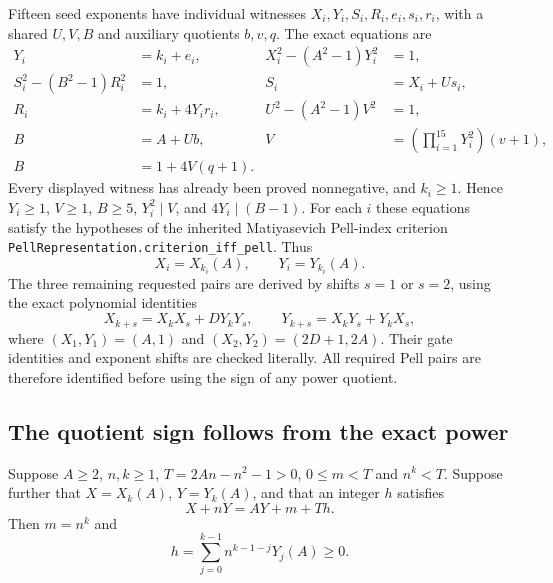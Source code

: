 Fifteen seed exponents have individual witnesses
$X_i,Y_i,S_i,R_i,e_i,s_i,r_i$, with a shared $U,V,B$ and auxiliary
quotients $b,v,q$.  The exact equations are
\begin{align}
 Y_i&=k_i+e_i,& X_i^2-(A^2-1)Y_i^2&=1,\nonumber\\
 S_i^2-(B^2-1)R_i^2&=1,& S_i&=X_i+Us_i,\nonumber\\
 R_i&=k_i+4Y_i r_i,& U^2-(A^2-1)V^2&=1,\label{dc:index}\\
 B&=A+Ub,&
 V&=\left(\prod_{i=1}^{15}Y_i^2\right)(v+1),\nonumber\\
 B&=1+4V(q+1).&&\nonumber
\end{align}
Every displayed witness has already been proved nonnegative, and
$k_i\ge1$.  Hence $Y_i\ge1$, $V\ge1$, $B\ge5$,
$Y_i^2\mid V$, and $4Y_i\mid(B-1)$.
For each $i$ these equations satisfy the hypotheses of the inherited
Matiyasevich Pell-index criterion
\texttt{PellRepresentation.criterion\_iff\_pell}.  Thus
\begin{equation}\label{dc:indexidentified}
 X_i=X_{k_i}(A),\qquad Y_i=Y_{k_i}(A).
\end{equation}
The three remaining requested pairs are derived by shifts $s=1$ or
$s=2$, using the exact polynomial identities
\begin{equation}\label{dc:addition}
 X_{k+s}=X_kX_s+DY_kY_s,
 \qquad Y_{k+s}=X_kY_s+Y_kX_s,
\end{equation}
where $(X_1,Y_1)=(A,1)$ and $(X_2,Y_2)=(2D+1,2A)$.
Their gate identities and exponent shifts are checked literally.
All required Pell pairs are therefore identified before using the
sign of any power quotient.

\subsection{The quotient sign follows from the exact power}

\begin{lemma}\label{dc:quotientlemma}
Suppose $A\ge2$, $n,k\ge1$, $T=2An-n^2-1>0$,
$0\le m<T$ and $n^k<T$.  Suppose further that
$X=X_k(A)$, $Y=Y_k(A)$, and that an integer $h$ satisfies
\begin{equation}\label{dc:power}
 X+nY=AY+m+Th.
\end{equation}
Then $m=n^k$ and
\begin{equation}\label{dc:hformula}
 h=\sum_{j=0}^{k-1}n^{k-1-j}Y_j(A)\ge0.
\end{equation}
\end{lemma}

